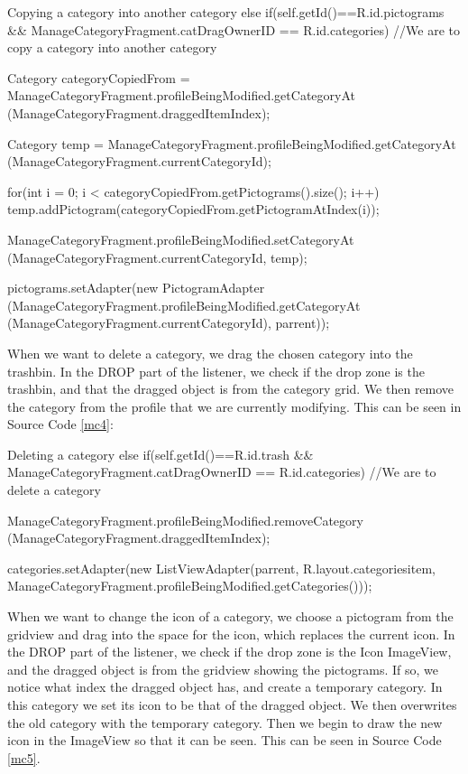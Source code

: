 \begin{source}[{mc3}]{Copying a category into another category}
else if(self.getId()==R.id.pictograms && ManageCategoryFragment.catDragOwnerID == R.id.categories) //We are to copy a category into another category
				{	
					
					Category categoryCopiedFrom = ManageCategoryFragment.profileBeingModified.getCategoryAt
						(ManageCategoryFragment.draggedItemIndex); 
					
					Category temp = ManageCategoryFragment.profileBeingModified.getCategoryAt
						(ManageCategoryFragment.currentCategoryId);
					
					for(int i = 0; i < categoryCopiedFrom.getPictograms().size(); i++)
					{
						temp.addPictogram(categoryCopiedFrom.getPictogramAtIndex(i)); 
					}
					
					ManageCategoryFragment.profileBeingModified.setCategoryAt
						(ManageCategoryFragment.currentCategoryId, temp);
					
					pictograms.setAdapter(new PictogramAdapter
						(ManageCategoryFragment.profileBeingModified.getCategoryAt
						(ManageCategoryFragment.currentCategoryId), parrent));
				}
\end{source}
When we want to delete a category, we drag the chosen category into the trashbin. 
In the DROP part of the listener, we check if the drop zone is the trashbin, and that the dragged object is from the category grid. 
We then remove the category from the profile that we are currently modifying. 
This can be seen in Source Code \ref{mc4}:

\begin{source}[{mc4}]{Deleting a category}
else if(self.getId()==R.id.trash && ManageCategoryFragment.catDragOwnerID == R.id.categories) //We are to delete a category
				{	
					ManageCategoryFragment.profileBeingModified.removeCategory
						(ManageCategoryFragment.draggedItemIndex);
					
					categories.setAdapter(new ListViewAdapter(parrent, R.layout.categoriesitem,
						ManageCategoryFragment.profileBeingModified.getCategories()));
				}
\end{source}
When we want to change the icon of a category, we choose a pictogram from the gridview and drag into the space for the icon, which replaces the current icon. 
In the DROP part of the listener, we check if the drop zone is the Icon ImageView, and the dragged object is from the gridview showing the pictograms. 
If so, we notice what index the dragged object has, and create a temporary category. 
In this category we set its icon to be that of the dragged object.  
We then overwrites the old category with the temporary category.
Then we begin to draw the new icon in the ImageView so that it can be seen. 
This can be seen in Source Code \ref{mc5}.

